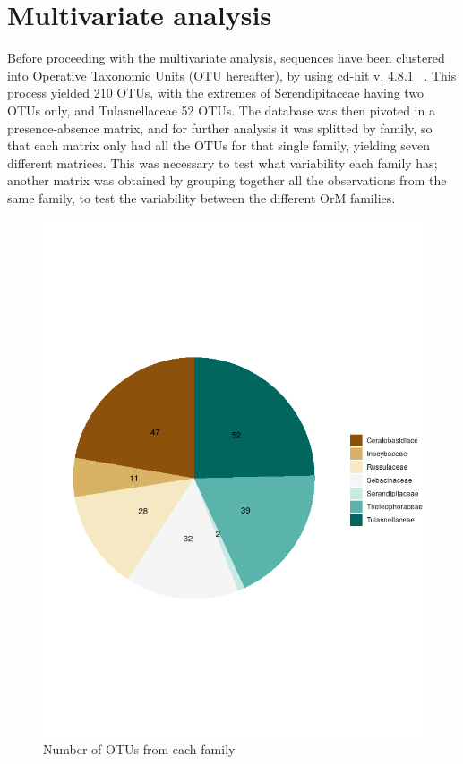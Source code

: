 \chapter{Multivariate analysis}
\label{multivariateanalysis}

Before proceeding with the multivariate analysis, sequences have been clustered into Operative Taxonomic Units (OTU hereafter), by using cd-hit v. 4.8.1 ~\citep{li2001}. This process yielded 210 OTUs, with the extremes of Serendipitaceae having two OTUs only, and Tulasnellaceae 52 OTUs.
The database was then pivoted in a presence-absence matrix, and for further analysis it was splitted by family, so that each matrix only had all the OTUs for that single family, yielding seven different matrices. This was necessary to test what variability each family has; another matrix was obtained by grouping together all the observations from the same family, to test the variability between the different OrM families.

\begin{figure}[htbp]
\centering
\includegraphics[keepaspectratio,width=\textwidth,height=0.75\textheight]{images/clust.png}
\caption{Number of OTUs from each family}
\end{figure}

